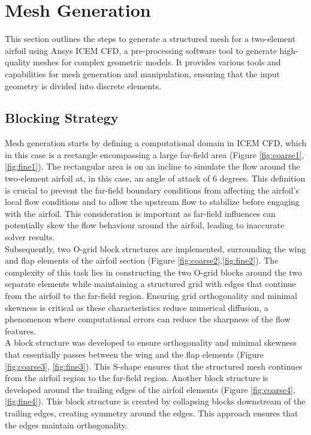 \section{Mesh Generation}

This section outlines the steps to generate a structured mesh for a two-element airfoil using Ansys ICEM CFD, a pre-processing software tool to generate high-quality meshes for complex geometric models. It provides various tools and capabilities for mesh generation and manipulation, ensuring that the input geometry is divided into discrete elements.

\subsection{Blocking Strategy}
Mesh generation starts by defining a computational domain in ICEM CFD, which in this case is a rectangle encompassing a large far-field area (Figure \ref{fig:coarse1}, \ref{fig:fine1}). The rectangular area is on an incline to simulate the flow around the two-element airfoil at, in this case, an angle of attack of 6 degrees. This definition is crucial to prevent the far-field boundary conditions from affecting the airfoil's local flow conditions and to allow the upstream flow to stabilize before engaging with the airfoil. This consideration is important as far-field influences can potentially skew the flow behaviour around the airfoil, leading to inaccurate solver results. \\

Subsequently, two O-grid block structures are implemented, surrounding the wing and flap elements of the airfoil section (Figure \ref{fig:coarse2},\ref{fig:fine2}). The complexity of this task lies in constructing the two O-grid blocks around the two separate elements while maintaining a structured grid with edges that continue from the airfoil to the far-field region. Ensuring grid orthogonality and minimal skewness is critical as these characteristics reduce numerical diffusion, a phenomenon where computational errors can reduce the sharpness of the flow features. \\

A block structure was developed to ensure orthogonality and minimal skewness that essentially passes between the wing and the flap elements (Figure \ref{fig:coarse3}, \ref{fig:fine3}). This S-shape ensures that the structured mesh continues from the airfoil region to the far-field region. Another block structure is developed around the trailing edges of the airfoil elements (Figure \ref{fig:coarse4}, \ref{fig:fine4}). This block structure is created by collapsing blocks downstream of the trailing edges, creating symmetry around the edges. This approach ensures that the edges maintain orthogonality.


